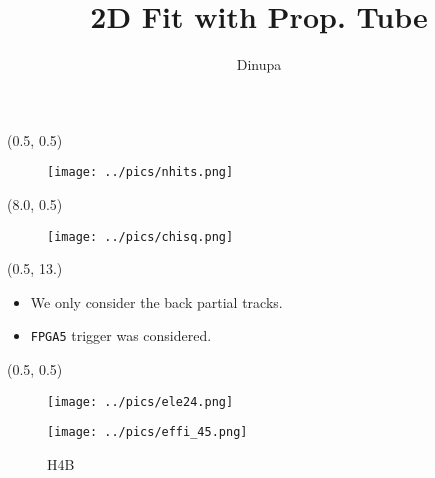 \documentclass[10pt, xcolor={dvipsnames}, aspectratio = 169]{beamer}
\title{2D Fit with Prop. Tube}
\author{Dinupa}
\begin{document}
\begin{frame}
\maketitle
\end{frame}


\begin{frame}[fragile]

\begin{textblock}{7.0}(0.5, 0.5)
\begin{figure}
\centering
\texttt{[image: ../pics/nhits.png]}
\end{figure}
\end{textblock}

\begin{textblock}{7.0}(8.0, 0.5)
\begin{figure}
\centering
\texttt{[image: ../pics/chisq.png]}
\end{figure}
\end{textblock}

\begin{textblock}{10.0}(0.5, 13.)
\begin{itemize}

	\item We only consider the back partial tracks.
	\item \verb|FPGA5| trigger was considered.
\end{itemize}
\end{textblock}

\end{frame}


\begin{frame}[fragile]

\begin{textblock}{7.0}(0.5, 0.5)
\begin{figure}
\centering
\texttt{[image: ../pics/ele24.png]}
\end{figure}
\end{textblock}

\end{frame}


\begin{frame}

\begin{figure}
\centering
\texttt{[image: ../pics/effi\_45.png]}
\caption{H4B}
\end{figure}

\end{frame}
\end{document}
